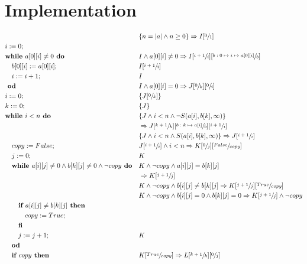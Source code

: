 \documentclass[a4paper]{article}
\begin{document}
\section{Implementation}
\begin{align*}
		& && \{ n=|a| \land n \geq 0 \} \Rightarrow I[\sfrac{0}{1}]\\
		& i := 0; \\
		& \textbf{while } a[0][i] \neq 0 \textbf{ do} && I \land a[0][i] \neq 0 \Rightarrow I[\sfrac{i+1}{i}][\sfrac{b:0\mapsto i \mapsto a[0][i]}{b}]\\
		& \quad b[0][i] := a[0][i];  && I[\sfrac{i+1}{i}] \\
		& \quad i := i + 1; && I \\
		& \textbf{ od} && I \land a[0][i] = 0 \Rightarrow J[\sfrac{0}{k}][\sfrac{0}{i}] \\
		& i := 0; && \{J[\sfrac{0}{k}]\}\\
		& k := 0; && \{J\} \\
		& \textbf{while } i < n \textbf{ do} && \{J \land i < n \land \neg S(a[i], b[k] , \infty)\} \\
		& &&\Rightarrow J[\sfrac{k+1}{k}][\sfrac{b:k \mapsto a[i]}{b}][\sfrac{i+1}{i}] \\
		& && \{J \land i < n \land S(a[i], b[k] , \infty)\} \Rightarrow J[\sfrac{i+1}{i}] \\
		& \quad copy := False; && J[\sfrac{i+1}{i}] \land i < n \Rightarrow K[\sfrac{0}{j}][\sfrac{False}{copy}] \\
		& \quad j := 0;  && K\\
		& \quad \textbf{while } a[i][j] \neq 0 \land b[k][j] \neq 0 \land \neg copy \textbf{ do} && K \land \neg copy \land a[i][j] = b[k][j]\\
		& && \Rightarrow K[\sfrac{j+1}{j}] \\
		& && K \land \neg copy \land b[i][j] \neq b[k][j] \Rightarrow K[\sfrac{j+1}{j}][\sfrac{True}{copy}]\\
		& && K \land \neg copy \land b[i][j] = 0 \land b[k][j] = 0 \Rightarrow K[\sfrac{j+1}{j}] \land \neg copy \\
		& \qquad \textbf{if } a[i][j] \neq b[k][j] \textbf{ then} \\
		& \qquad \quad copy := True; \\
		& \qquad \textbf{fi} \\
		& \qquad j := j + 1; && K\\
		& \quad \textbf{od} \\
		& \quad \textbf{if } copy \textbf{ then} && K[\sfrac{True}{copy}] \Rightarrow L[\sfrac{k+1}{k}][\sfrac{0}{j}] \\

\end{align*}
\end{document}
